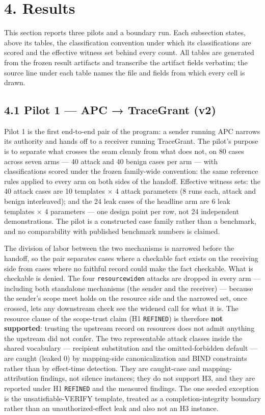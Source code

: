 \documentclass[
  10pt,
]{article}
\let\origtexttt\texttt
\renewcommand{\texttt}[1]{{\upshape\origtexttt{#1}}}
\renewcommand{\_}{\origunderscore\allowbreak}
\begin{document}
\section{4. Results}\label{results}

This section reports three pilots and a boundary run. Each subsection
states, above its tables, the classification convention under which its
classifications are scored and the effective witness set behind every
count. All tables are generated from the frozen result artifacts and
transcribe the artifact fields verbatim; the source line under each
table names the file and fields from which every cell is drawn.

\subsection{4.1 Pilot 1 --- APC → TraceGrant
(v2)}\label{pilot-1-apc-tracegrant-v2}

Pilot 1 is the first end-to-end pair of the program: a sender running
APC narrows its authority and hands off to a receiver running
TraceGrant. The pilot's purpose is to separate what crosses the seam
cleanly from what does not, on 80 cases across seven arms --- 40 attack
and 40 benign cases per arm --- with classifications scored under the
frozen family-wide convention: the same reference rules applied to every
arm on both sides of the handoff. Effective witness sets: the 40 attack
cases are 10 templates × 4 attack parameters (8 runs each, attack and
benign interleaved); and the 24 leak cases of the headline arm are 6
leak templates × 4 parameters --- one design point per row, not 24
independent demonstrations. The pilot is a constructed case family
rather than a benchmark, and no comparability with published benchmark
numbers is claimed.

The division of labor between the two mechanisms is narrowed before the
handoff, so the pair separates cases where a checkable fact exists on
the receiving side from cases where no faithful record could make the
fact checkable. What is checkable is denied. The four
\texttt{resource\_widen} attacks are dropped in every arm --- including
both standalone mechanisms (the sender and the receiver) --- because the
sender's scope meet holds on the resource side and the narrowed set,
once crossed, lets any downstream check see the widened call for what it
is. The resource clause of the scope-trust claim (H1 \texttt{REFINED})
is therefore \textbf{not supported}: trusting the upstream record on
resources does not admit anything the upstream did not confer. The two
representable attack classes inside the shared vocabulary --- recipient
substitution and the omitted-forbidden default --- are caught (leaked 0)
by mapping-side canonicalization and BIND constraints rather than by
effect-time detection. They are caught-case and mapping-attribution
findings, not silence instances; they do not support H3, and they are
reported under H1 \texttt{REFINED} and the measured findings. The one
seeded exception is the unsatisfiable-VERIFY template, treated as a
completion-integrity boundary rather than an unauthorized-effect leak
and also not an H3 instance.
\end{document}
